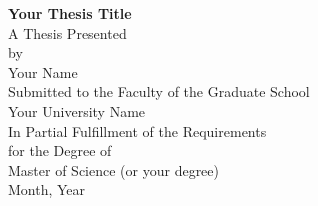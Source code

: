 \documentclass[12pt, a4paper, twoside]{report}
\begin{document}
\begin{titlepage}
  \centering
  \vspace*{\fill}
  \Huge\textbf{Your Thesis Title}\\
  \vspace{0.5in}
  \Large{A Thesis Presented}\\
  \Large{by}\\
  \Large{Your Name}\\
  \vspace{0.5in}
  \Large{Submitted to the Faculty of the Graduate School}\\
  \Large{Your University Name}\\
  \vspace{0.5in}
  \Large{In Partial Fulfillment of the Requirements}\\
  \Large{for the Degree of}\\
  \Large{Master of Science (or your degree)}\\
  \vspace{0.5in}
  \Large{Month, Year}\\
  \vspace*{\fill}
\end{titlepage}




%
%
%
%
%
%
%



\end{document}

